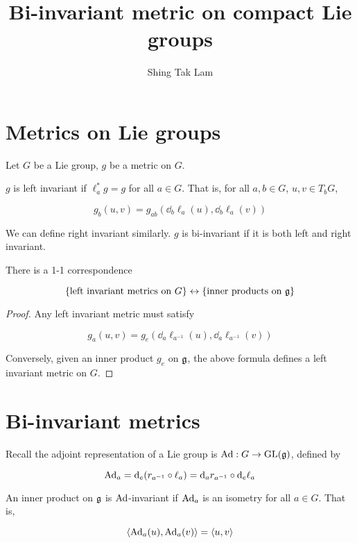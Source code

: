 \documentclass{article}
\title{Bi-invariant metric on compact Lie groups}
\author{Shing Tak Lam}
\begin{document}
\maketitle

\section{Metrics on Lie groups}

Let \(G\) be a Lie group, \(g\) be a metric on \(G\).

\begin{definition}
     \(g\) is left invariant if \(\ell_a^*g = g\) for all \(a \in G\). That is, for all \(a, b \in G\), \(u, v \in T_bG\),

    \[g_b(u, v) = g_{ab}(\dd_b\ell_a(u), \dd_b\ell_a(v))\]

    We can define right invariant similarly. \(g\) is bi-invariant if it is both left and right invariant.
\end{definition}

\begin{proposition}
    There is a 1-1 correspondence

    \[\{\text{left invariant metrics on }G\} \leftrightarrow \{\text{inner products on }\mathfrak{g}\}\]
\end{proposition}

\begin{proof}
    Any left invariant metric must satisfy

    \[g_a(u, v) = g_e(\dd_a\ell_{a^{-1}}(u), \dd_a\ell_{a^{-1}}(v))\]

    Conversely, given an inner product \(g_e\) on \(\mathfrak{g}\), the above formula defines a left invariant metric on \(G\).
\end{proof}

\section{Bi-invariant metrics}

Recall the adjoint representation of a Lie group is \(\operatorname{Ad} : G \to \operatorname{GL}(\mathfrak{g})\), defined by

\[\operatorname{Ad}_a = \dd_e(r_{a^{-1}} \circ \ell_a) = \dd_a r_{a^{-1}} \circ \dd_e \ell_a\]

\begin{definition}
    [\(\Ad\)-invariant] An inner product on \(\mathfrak{g}\) is \(\Ad\)-invariant if \(\operatorname{Ad}_a\) is an isometry for all \(a \in G\). That is,

    \[\left\langle \operatorname{Ad}_a(u), \operatorname{Ad}_a(v) \right\rangle = \left\langle u, v \right\rangle\]
\end{definition}
\end{document}
